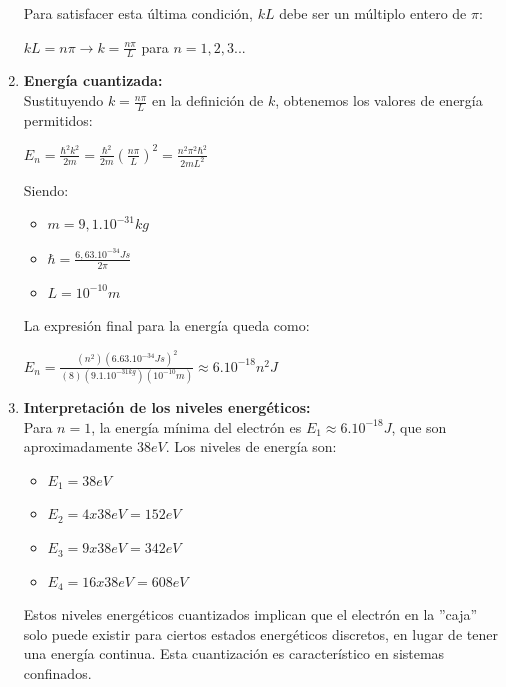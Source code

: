 \documentclass[a4paper]{article}
\begin{document}
\begin{enumerate}
				Para satisfacer esta última condición, $kL$ debe ser un múltiplo entero de $\pi$:

				\begin{center}
					$kL = n \pi \rightarrow k = \frac{n \pi}{L}$ \hspace{5mm} para $n = 1,2,3...$
				\end{center}

			\item \indent \textbf{Energía cuantizada:} \\
				Sustituyendo $k = \frac{n \pi}{L}$ en la definición de $k$, obtenemos los valores de energía permitidos:

				\begin{center}
					$E_n = \frac{\hbar ^2 k^2}{2m} = \frac{\hbar ^2}{2m} (\frac{n \pi}{L})^2 = \frac{n^2 \pi^2 \hbar^2}{2mL^2}$
				\end{center}

				Siendo:

				\begin{itemize}
					\item $m = 9,1 . 10^{-31} kg$
					\item $\hbar = \frac {6,63 . 10^{-34} Js}{2 \pi}$
					\item $L = 10^{-10}m$
				\end{itemize}

				La expresión final para la energía queda como:

				\begin{center}
					$E_n = \frac {(n^2)(6.63 . 10^{-34} Js)^2}{(8)(9.1 . 10^{-31 kg}) (10^{-10}m)} \approx 6 . 10^{-18}n^2 J$
				\end{center}

			\item \indent \textbf{Interpretación de los niveles energéticos:} \\
				Para $n = 1$, la energía mínima del electrón es $E_1 \approx 6 . 10^{-18} J$, que son aproximadamente $38eV$. Los niveles de energía son: 

				\begin{itemize}
					\item $E_1 = 38eV$
					\item $E_2 = 4 x 38eV = 152 eV$
					\item $E_3 = 9 x 38eV = 342 eV$
					\item $E_4 = 16 x 38eV = 608 eV$
				\end{itemize}

				Estos niveles energéticos cuantizados implican que el electrón en la ''caja'' solo puede existir para ciertos estados energéticos discretos, en lugar de tener una energía continua. Esta cuantización es característico en sistemas confinados.

	\end{enumerate}
\end{document}
